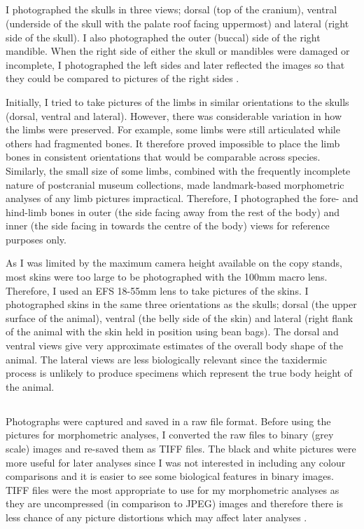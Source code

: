 \subsection{}
	I photographed the skulls in three views; dorsal (top of the cranium), ventral (underside of the skull with the palate roof facing uppermost) and lateral (right side of the skull). I also photographed the outer (buccal) side of the right mandible. When the right side of either the skull or mandibles were damaged or incomplete, I photographed the left sides and later reflected the images so that they could be compared to pictures of the right sides \citep[e.g.][]{Barrow2008}.

	Initially, I tried to take pictures of the limbs in similar orientations to the skulls (dorsal, ventral and lateral). However, there was considerable variation in how the limbs were preserved. For example, some limbs were still articulated while others had fragmented bones. It therefore proved impossible to place the limb bones in consistent orientations that would be comparable across species. Similarly, the small size of some limbs, combined with the frequently incomplete nature of postcranial museum collections, made landmark-based morphometric analyses of any limb pictures impractical. Therefore, I photographed the fore- and hind-limb bones in outer (the side facing away from the rest of the body) and inner (the side facing in towards the centre of the body) views for reference purposes only.

	As I was limited by the maximum camera height available on the copy stands, most skins were too large to be photographed with the 100mm macro lens. Therefore, I used an EFS 18-55mm lens to take pictures of the skins. I photographed skins in the same three orientations as the skulls; dorsal (the upper surface of the animal), ventral (the belly side of the skin) and lateral (right flank of the animal with the skin held in position using bean bags). The dorsal and ventral views give very approximate estimates of the overall body shape of the animal. The lateral views are less biologically relevant since the taxidermic process is unlikely to produce specimens which represent the true body height of the animal.

\subsection{}
	Photographs were captured and saved in a raw file format. Before using the pictures for morphometric analyses, I converted the raw files to binary (grey scale) images and re-saved them as TIFF files. The black and white pictures were more useful for later analyses since I was not interested in including any colour comparisons and it is easier to see some biological features in binary images. TIFF files were the most appropriate to use for my morphometric analyses as they are uncompressed (in comparison to JPEG) images and therefore there is less chance of any picture distortions which may affect later analyses \citep{HERC2013}.

